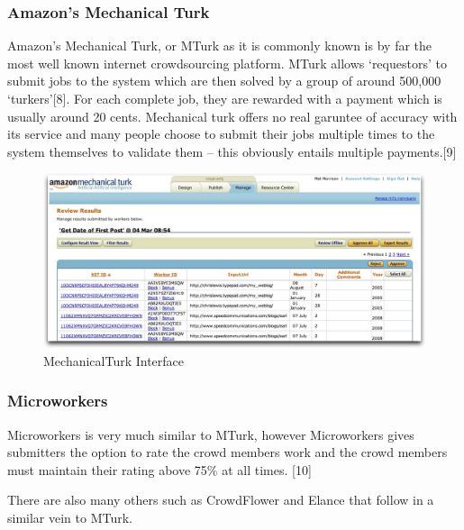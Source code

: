 \documentclass[11pt]{article}
\begin{document}
\subsubsection{Amazon's Mechanical Turk}
Amazon's Mechanical Turk, or MTurk as it is commonly known is by far the most well known
internet crowdsourcing platform. MTurk allows `requestors' to submit jobs to the 
system which are then solved by a group of around 500,000 `turkers'[8]. For each 
complete job, they are rewarded with a payment which is usually around 20 cents.
Mechanical turk offers no real garuntee of accuracy 
with its service and many people choose to submit their jobs multiple times to the
system themselves to validate them -- this obviously entails multiple payments.[9]


\begin{figure}[htbp]
\begin{center}
\includegraphics[width=\linewidth]{images/mturkinterface.jpg}
\caption{MechanicalTurk Interface}
\label{default}
\end{center}
\end{figure}



\subsubsection{Microworkers}
Microworkers is very much similar to MTurk, however Microworkers gives submitters the 
option to rate the crowd members work and the crowd members must maintain their rating above 75\% at
all times. [10]

There are also many others such as CrowdFlower and Elance that follow in a similar vein to MTurk.
\end{document}
